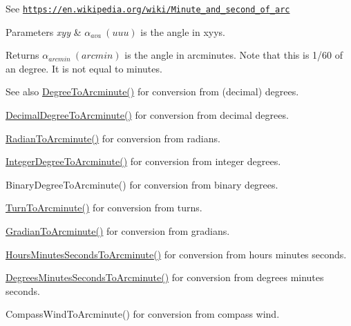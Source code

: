 See \href{https://en.wikipedia.org/wiki/Minute_and_second_of_arc}{\tt https\+://en.\+wikipedia.\+org/wiki/\+Minute\+\_\+and\+\_\+second\+\_\+of\+\_\+arc} 
\begin{DoxyParams}{Parameters}
{\em xyy} & $\alpha_{ava}\ (uuu)$ is the angle in xyys. \\
\hline
\end{DoxyParams}
\begin{DoxyReturn}{Returns}
$\alpha_{arcmin}\ (arcmin)$ is the angle in arcminutes. Note that this is 1/60 of an degree. It is not equal to minutes. 
\end{DoxyReturn}
\begin{DoxySeeAlso}{See also}
\mbox{\hyperlink{group___e_g_x_math-_angle_conversions-_degree_ga8abf327dc5f52907b2c881999e9cc43e}{Degree\+To\+Arcminute()}} for conversion from (decimal) degrees. 

\mbox{\hyperlink{group___e_g_x_math-_angle_conversions-_decimal_degree_ga6b6ea6e45d2a13f556824ca419cc9fbd}{Decimal\+Degree\+To\+Arcminute()}} for conversion from decimal degrees. 

\mbox{\hyperlink{group___e_g_x_math-_angle_conversions-_radian_ga722e3b8e78540a6b3942b73b64aeb8d2}{Radian\+To\+Arcminute()}} for conversion from radians. 

\mbox{\hyperlink{group___e_g_x_math-_angle_conversions-_integer_degree_ga78b014e7649d666a3647c467e64e4fe8}{Integer\+Degree\+To\+Arcminute()}} for conversion from integer degrees. 

Binary\+Degree\+To\+Arcminute() for conversion from binary degrees. 

\mbox{\hyperlink{group___e_g_x_math-_angle_conversions-_turn_ga72cda928d9043c7d82097b1a7920769e}{Turn\+To\+Arcminute()}} for conversion from turns. 

\mbox{\hyperlink{group___e_g_x_math-_angle_conversions-_gradian_ga67ef7daad49b0d73c39c52d426ab46a5}{Gradian\+To\+Arcminute()}} for conversion from gradians. 

\mbox{\hyperlink{group___e_g_x_math-_angle_conversions-_hours_minutes_seconds_ga23bfa5abeb014726c2e2ac6303be5dae}{Hours\+Minutes\+Seconds\+To\+Arcminute()}} for conversion from hours minutes seconds. 

\mbox{\hyperlink{group___e_g_x_math-_angle_conversions-_degrees_minutes_seconds_gadb8da2c4b9cdd4f618b6281314b1318c}{Degrees\+Minutes\+Seconds\+To\+Arcminute()}} for conversion from degrees minutes seconds. 

Compass\+Wind\+To\+Arcminute() for conversion from compass wind. 
\end{DoxySeeAlso}
\mbox{\label{group___e_g_x_math-_angle_conversions-_x_z_x_gaebb234b957f08dcd4f84726bcd3cdf62}} 
